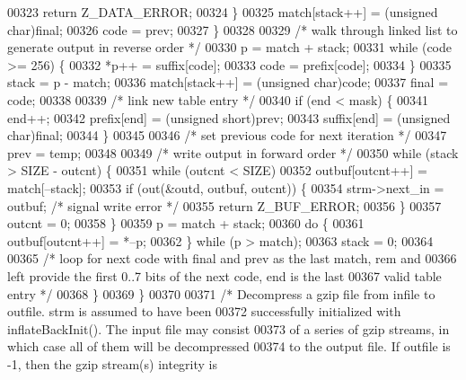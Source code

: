\begin{DoxyCode}
00323                 \textcolor{keywordflow}{return} Z\_DATA\_ERROR;
00324             \}
00325             match[stack++] = (\textcolor{keywordtype}{unsigned} char)\textcolor{keyword}{final};
00326             code = prev;
00327         \}
00328 
00329         \textcolor{comment}{/* walk through linked list to generate output in reverse order */}
00330         p = match + stack;
00331         \textcolor{keywordflow}{while} (code >= 256) \{
00332             *p++ = suffix[code];
00333             code = prefix[code];
00334         \}
00335         stack = p - match;
00336         match[stack++] = (\textcolor{keywordtype}{unsigned} char)code;
00337         \textcolor{keyword}{final} = code;
00338 
00339         \textcolor{comment}{/* link new table entry */}
00340         \textcolor{keywordflow}{if} (end < mask) \{
00341             end++;
00342             prefix[end] = (\textcolor{keywordtype}{unsigned} short)prev;
00343             suffix[end] = (\textcolor{keywordtype}{unsigned} char)\textcolor{keyword}{final};
00344         \}
00345 
00346         \textcolor{comment}{/* set previous code for next iteration */}
00347         prev = temp;
00348 
00349         \textcolor{comment}{/* write output in forward order */}
00350         \textcolor{keywordflow}{while} (stack > SIZE - outcnt) \{
00351             \textcolor{keywordflow}{while} (outcnt < SIZE)
00352                 outbuf[outcnt++] = match[--stack];
00353             \textcolor{keywordflow}{if} (out(&outd, outbuf, outcnt)) \{
00354                 strm->next\_in = outbuf; \textcolor{comment}{/* signal write error */}
00355                 \textcolor{keywordflow}{return} Z\_BUF\_ERROR;
00356             \}
00357             outcnt = 0;
00358         \}
00359         p = match + stack;
00360         \textcolor{keywordflow}{do} \{
00361             outbuf[outcnt++] = *--p;
00362         \} \textcolor{keywordflow}{while} (p > match);
00363         stack = 0;
00364 
00365         \textcolor{comment}{/* loop for next code with final and prev as the last match, rem and}
00366 \textcolor{comment}{           left provide the first 0..7 bits of the next code, end is the last}
00367 \textcolor{comment}{           valid table entry */}
00368     \}
00369 \}
00370 
00371 \textcolor{comment}{/* Decompress a gzip file from infile to outfile.  strm is assumed to have been}
00372 \textcolor{comment}{   successfully initialized with inflateBackInit().  The input file may consist}
00373 \textcolor{comment}{   of a series of gzip streams, in which case all of them will be decompressed}
00374 \textcolor{comment}{   to the output file.  If outfile is -1, then the gzip stream(s) integrity is}

\end{DoxyCode}
